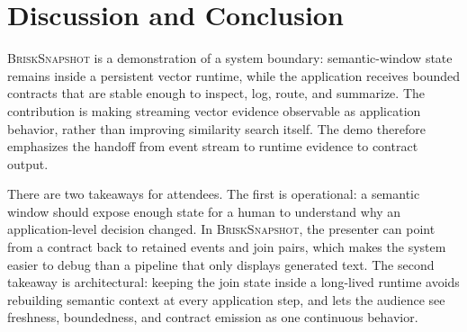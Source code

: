 \documentclass[sigconf,anonymous]{acmart}
\newcommand{\system}{\textsc{BriskSnapshot}}
\begin{document}
\section{Discussion and Conclusion}

\system{} is a demonstration of a system boundary: semantic-window state remains inside a persistent vector runtime, while the application receives bounded contracts that are stable enough to inspect, log, route, and summarize. The contribution is making streaming vector evidence observable as application behavior, rather than improving similarity search itself. The demo therefore emphasizes the handoff from event stream to runtime evidence to contract output.

There are two takeaways for attendees. The first is operational: a semantic window should expose enough state for a human to understand why an application-level decision changed. In \system{}, the presenter can point from a contract back to retained events and join pairs, which makes the system easier to debug than a pipeline that only displays generated text. The second takeaway is architectural: keeping the join state inside a long-lived runtime avoids rebuilding semantic context at every application step, and lets the audience see freshness, boundedness, and contract emission as one continuous behavior.



\end{document}
